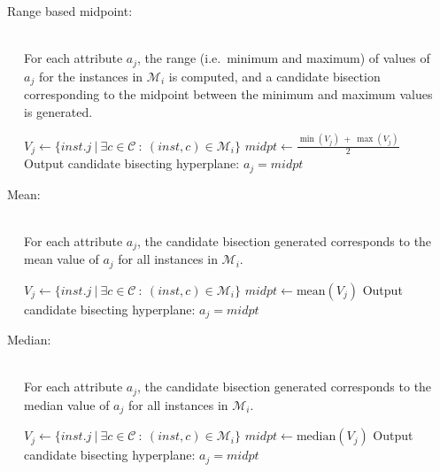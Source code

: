 \documentclass[a4paper,12pt]{article} %
\newcommand{\mcl}[1]{\mathcal{#1}}
\begin{document}
\begin{description}

\item[~~~Range based midpoint:] \ \\
    For each attribute $a_j$, 
    the range (i.e.\ minimum and maximum) of 
        values of $a_j$ 
        for the instances in $\mcl{M}_i$ is computed, 
        and a candidate bisection corresponding to the midpoint between the 
        minimum and maximum values is generated.
    \begin{algorithmic}
        \State $V_j \gets \{ inst.j ~\big|~ \exists c \in \mcl{C} ~:~ (inst,c) \in \mcl{M}_i \}$
        \State $midpt \gets \frac{\min(V_j) ~+~ \max(V_j)}{2}$
        \State Output candidate bisecting hyperplane: $a_j = midpt $
    \EndFor
    \end{algorithmic}
    
\item[~~~Mean:]  \ \\
    For each attribute $a_j$, 
        the candidate bisection generated corresponds to 
        the mean value of $a_j$ 
        for all instances in $\mcl{M}_i$.
    \begin{algorithmic}
        \State $V_j \gets \{ inst.j ~\big|~ \exists c \in \mcl{C} ~:~ (inst,c) \in \mcl{M}_i \}$
        \State $midpt \gets \textrm{mean}(V_j)$
        \State Output candidate bisecting hyperplane: $a_j = midpt $
    \EndFor
    \end{algorithmic}        
        

\item[~~~Median:]  \ \\
    For each attribute $a_j$, 
        the candidate bisection generated corresponds to 
        the median value of $a_j$ 
        for all instances in $\mcl{M}_i$.
    \begin{algorithmic}
        \State $V_j \gets \{ inst.j ~\big|~ \exists c \in \mcl{C} ~:~ (inst,c) \in \mcl{M}_i \}$
        \State $midpt \gets \textrm{median}(V_j)$
        \State Output candidate bisecting hyperplane: $a_j = midpt $
    \EndFor
    \end{algorithmic}  
    

\end{description}
\end{document}
